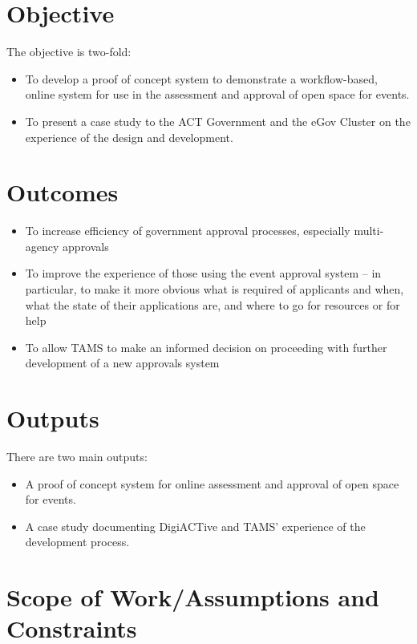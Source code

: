 \documentclass[12pt,a4paper,twosided]{article}
\begin{document}
\section{Objective}

The objective is two-fold:

\begin{itemize}
\itemsep1pt\parskip0pt
\item
  To develop a proof of concept system to demonstrate a workflow-based,
  online system for use in the assessment and approval of open space for
  events.
\item
  To present a case study to the ACT Government and the eGov Cluster on
  the experience of the design and development.
\end{itemize}

\section{Outcomes}

\begin{itemize}
\itemsep1pt\parskip0pt
\item
  To increase efficiency of government approval processes, especially
  multi-agency approvals
\item
  To improve the experience of those using the event approval system --
  in particular, to make it more obvious what is required of applicants
  and when, what the state of their applications are, and where to go
  for resources or for help
\item
  To allow TAMS to make an informed decision on proceeding with further
  development of a new approvals system
\end{itemize}

\section{Outputs}

There are two main outputs:

\begin{itemize}
\itemsep1pt\parskip0pt
\item
  A proof of concept system for online assessment and approval of open
  space for events.
\item
  A case study documenting DigiACTive and TAMS' experience of the
  development process.
\end{itemize}

\section{Scope of Work/Assumptions and Constraints}
\end{document}
